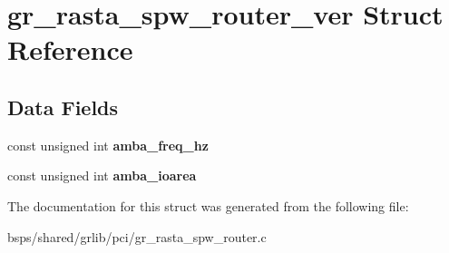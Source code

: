 \hypertarget{structgr__rasta__spw__router__ver}{}\section{gr\+\_\+rasta\+\_\+spw\+\_\+router\+\_\+ver Struct Reference}
\label{structgr__rasta__spw__router__ver}
\subsection*{Data Fields}
\begin{DoxyCompactItemize}
\item 
\mbox{\label{structgr__rasta__spw__router__ver_a4f45f95efd54ac61df49416e93e7042c}} 
const unsigned int {\bfseries amba\+\_\+freq\+\_\+hz}
\item 
\mbox{\label{structgr__rasta__spw__router__ver_a858cd3e220ddb1d80aed4a028a089fb8}} 
const unsigned int {\bfseries amba\+\_\+ioarea}
\end{DoxyCompactItemize}


The documentation for this struct was generated from the following file\+:\begin{DoxyCompactItemize}
\item 
bsps/shared/grlib/pci/gr\+\_\+rasta\+\_\+spw\+\_\+router.\+c\end{DoxyCompactItemize}
